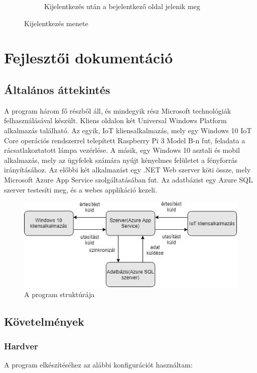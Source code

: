 \documentclass[a4paper,12pt]{report}
\begin{document}
\begin{figure}[H]
\begin{subfigure}[b]{0.4\linewidth}
            \caption{Kijelentkezés után a bejelentkező oldal jelenik meg}
        \end{subfigure}
        \caption{Kijelentkezés menete}
        \label{fig:Logout}
    \end{figure}

    \chapter{Fejlesztői dokumentáció}

    \section{Általános áttekintés}
    A program három fő részből áll, és mindegyik rész Microsoft technológiák felhasználásával készült. Kliens oldalon két
    Universal Windows Platform alkalmazás található. Az egyik, IoT kliensalkalmazás, mely egy Windows 10 IoT Core operációs rendszerrel
    telepített Raspberry Pi 3 Model B-n fut, feladata a rácsatlakoztatott lámpa vezérlése. A másik, egy Windows 10 asztali és mobil
    alkalmazás, mely az ügyfelek számára nyújt kényelmes felületet a fényforrás irányításához. Az előbbi két alkalmazást egy .NET Web
    szerver köti össze, mely Microsoft Azure App Service szolgáltatásában fut. Az adatbázist egy Azure SQL szerver testesíti meg, és a webes
    applikáció kezeli.

    \begin{figure}[H]
        \centering
        \includegraphics[width=\linewidth]{images/struktura.jpg}
        \caption{A program struktúrája}
        \label{fig: Struktura}
    \end{figure}

    \section{Követelmények}

    \subsection{Hardver}
    A program elkészítéséhez az alábbi konfigurációt használtam:
\end{document}
